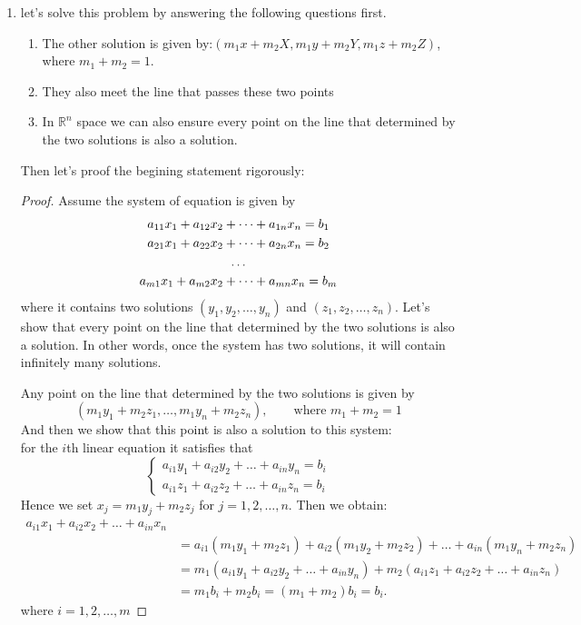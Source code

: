 \begin{enumerate}
\item
let's solve this problem by answering the following questions first.
\begin{enumerate}
\item
The other solution is given by:$(m_1x+m_2X,m_1y+m_2Y,m_1z+m_2Z)$, where $m_1+m_2=1$.
\item
They also meet the line that passes these two points
\item
In $\mathbb{R}^{n}$ space we can also ensure every point on the line that determined by the two solutions is also a solution.
\end{enumerate}
Then let's proof the begining statement rigorously:
\begin{proof}
Assume the system of equation is given by 
\begin{gather}
a_{11}x_1 + a_{12}x_2 + \dots + a_{1n}x_n = b_1 \notag \\ 
a_{21}x_1 + a_{22}x_2 + \dots + a_{2n}x_n = b_2 \notag \\
\dots 	\notag 	\\
a_{m1}x_1 + a_{m2}x_2 + \dots + a_{mn}x_n = b_m  \label{eq:linear system equations}
\end{gather}
where it contains two solutions $(y_1,y_2,\dots,y_n)$ and $(z_1,z_2,\dots,z_n)$. Let's show that every point on the line that determined by the two solutions is also a solution. In other words, once the system has two solutions, it will contain infinitely many solutions.

\qquad Any point on the line that determined by the two solutions is given by 
\[(m_1y_1+m_2z_1,\dots,m_1y_n+m_2z_n),\qquad \text{where } m_1+m_2=1\]
And then we show that this point is also a solution to this system:\\
\hspace*{1cm} for the $i$th linear equation it satisfies that 
\[
\left\{ \begin{aligned}
a_{i1}y_1 + a_{i2}y_2 + \dots + a_{in}y_n = b_i \\
a_{i1}z_1 + a_{i2}z_2 + \dots + a_{in}z_n = b_i
\end{aligned}
\right.
\]
\qquad Hence we set $x_j = m_1y_j+m_2z_j$ for $j = 1,2,\dots,n$. Then we obtain:
\begin{align*}
a_{i1}x_1 + a_{i2}x_2 + \dots + a_{in}x_n&\\ &= a_{i1}(m_1y_1+m_2z_1) + a_{i2}(m_1y_2+m_2z_2) + \dots + a_{in}(m_1y_n+m_2z_n)\\ &= m_1(a_{i1}y_1 + a_{i2}y_2 + \dots + a_{in}y_n) + m_2(a_{i1}z_1 + a_{i2}z_2 + \dots + a_{in}z_n)\\ &= m_1b_i + m_2b_i = (m_1+m_2)b_i=b_i.
\end{align*}
\qquad where $ i= 1,2,\dots,m$


\end{proof}
\end{enumerate}
